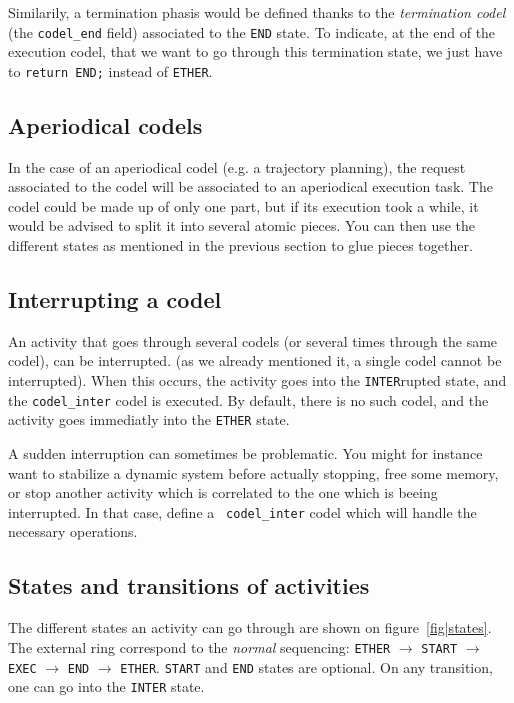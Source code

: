 Similarily, a termination phasis   would be defined   thanks to the  {\em
termination codel} (the {\tt codel\_end} field) associated to the
{\tt END} state. To indicate, at the end of  the execution codel, that we
want to go through this  termination state, we just  have to {\tt  return
END;} instead of {\tt ETHER}.


\subsection{Aperiodical codels}

In  the case of  an aperiodical codel (e.g.   a trajectory planning), the
request associated  to the codel  will be  associated to  an  aperiodical
execution task. The codel  could be made up of  only one part, but if its
execution took  a while,  it  would be advised  to  split it into several
atomic pieces.  You can then use the different states as mentioned in the
previous section to glue pieces together.


\subsection{Interrupting a codel}

An activity that  goes through several  codels (or  several times through
the  same codel), can  be  interrupted.  (as  we already  mentioned it, a
single codel cannot be interrupted). When  this occurs, the activity goes
into the  {\tt INTER}rupted  state,  and the  {\tt  codel\_inter}
codel is executed.  By default, there is  no such codel, and the activity
goes immediatly into the {\tt ETHER} state.

A  sudden  interruption can   sometimes  be problematic.  You  might  for
instance  want  to stabilize a dynamic   system before actually stopping,
free some memory, or stop another activity which is correlated to the one
which   is  beeing     interrupted.  In   that  case,   define    a  {\tt
codel\_inter} codel which will handle the necessary operations.


\subsection{States and transitions of activities}

The   different  states   an  activity can   go   through  are  shown  on
figure~\ref{fig|states}. The external ring correspond to the {\em normal}
sequencing: {\tt  ETHER} $\rightarrow$   {\tt START} $\rightarrow$   {\tt
EXEC} $\rightarrow$ {\tt END}  $\rightarrow$ {\tt ETHER}. {\tt START} and
{\tt END}  states are optional.   On any transition, one  can go into the
{\tt INTER} state.

